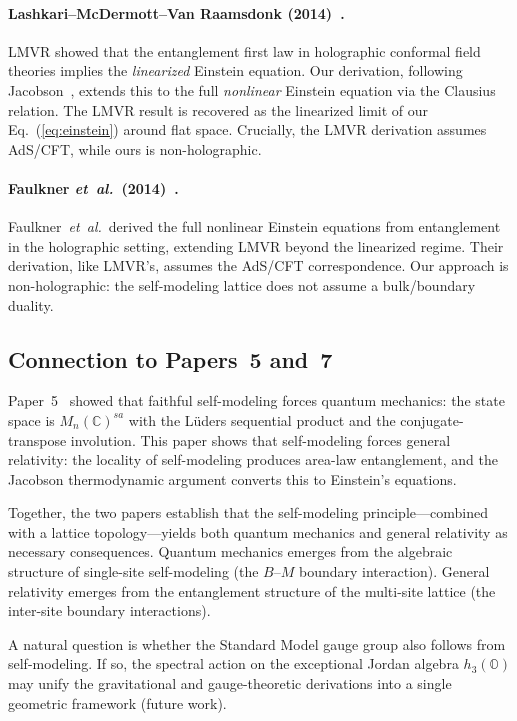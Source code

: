 \paragraph{Lashkari--McDermott--Van Raamsdonk (2014)~\cite{LMVR2014}.}
LMVR showed that the entanglement first law in holographic conformal field
theories implies the \emph{linearized} Einstein equation.  Our
derivation, following Jacobson~\cite{Jacobson1995}, extends this to the
full \emph{nonlinear} Einstein equation via the Clausius relation.
The LMVR result is recovered as the linearized limit of our
Eq.~(\ref{eq:einstein}) around flat space.  Crucially, the LMVR derivation
assumes AdS/CFT, while ours is non-holographic.

\paragraph{Faulkner \textit{et~al.}\ (2014)~\cite{Faulkner2014}.}
Faulkner~\textit{et~al.}\ derived the full nonlinear Einstein equations
from entanglement in the holographic setting, extending LMVR beyond the
linearized regime.  Their derivation, like LMVR's, assumes the AdS/CFT
correspondence.  Our approach is non-holographic: the self-modeling
lattice does not assume a bulk/boundary duality.

\subsection{Connection to Papers~5 and~7}
\label{sec:paper5-connection}

Paper~5~\cite{Paper5} showed that faithful self-modeling forces quantum
mechanics: the state space is $M_n(\mathbb{C})^{sa}$ with the L\"uders
sequential product and the conjugate-transpose involution.  This paper
shows that self-modeling forces general relativity: the locality of
self-modeling produces area-law entanglement, and the Jacobson
thermodynamic argument converts this to Einstein's equations.

Together, the two papers establish that the self-modeling
principle---combined with a lattice topology---yields both quantum
mechanics and general relativity as necessary consequences.  Quantum
mechanics emerges from the algebraic structure of single-site
self-modeling (the $B$--$M$ boundary interaction).  General relativity
emerges from the entanglement structure of the multi-site lattice (the
inter-site boundary interactions).

A natural question is whether the Standard Model gauge group also follows
from self-modeling.  If so, the spectral action on the exceptional Jordan
algebra $h_3(\mathbb{O})$ may unify the gravitational and
gauge-theoretic derivations into a single geometric framework (future
work).

